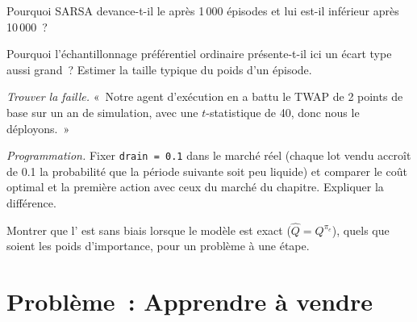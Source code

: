 \begin{exercise}[$\star\star$]\label{exo:ml:reinforcement-learning-foundations:4}
Pourquoi SARSA devance-t-il le  après 1\,000 épisodes et lui est-il inférieur après 10\,000~?
\end{exercise}

\begin{exercise}[$\star\star$]\label{exo:ml:reinforcement-learning-foundations:5}
Pourquoi l'échantillonnage préférentiel ordinaire présente-t-il ici un écart type aussi grand~? Estimer la taille typique du poids
d'un épisode.
\end{exercise}

\begin{exercise}[$\star\star$]\label{exo:ml:reinforcement-learning-foundations:6}
\emph{Trouver la faille.} «~Notre agent d'exécution en  a battu le TWAP de 2 points de base sur un an de simulation, avec une
$t$-statistique de 40, donc nous le déployons.~»
\end{exercise}

\begin{exercise}[$\star\star\star$]\label{exo:ml:reinforcement-learning-foundations:7}
\emph{Programmation.} Fixer \texttt{drain = 0.1} dans le marché réel (chaque lot vendu accroît de
0.1 la probabilité que la période suivante soit peu liquide) et comparer le coût optimal et la première action avec ceux du marché du chapitre. Expliquer la différence.
\end{exercise}

\begin{exercise}[$\star\star\star$]\label{exo:ml:reinforcement-learning-foundations:8}
Montrer que l' est sans biais lorsque le modèle est exact ($\hat Q = Q^{\pi_e}$), quels que soient les
poids d'importance, pour un problème à une étape.
\end{exercise}

\section{Problème~: Apprendre à vendre}

